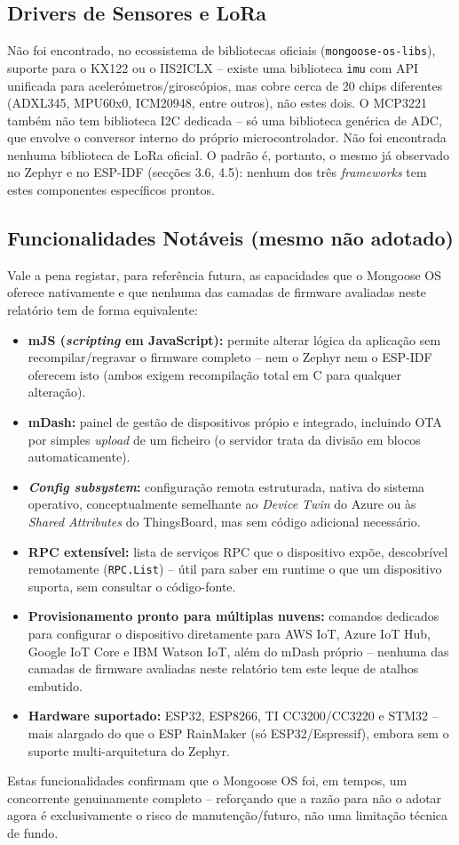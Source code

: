 \documentclass[a4paper,12pt]{article}
\begin{document}
\subsection{Drivers de Sensores e LoRa}
Não foi encontrado, no ecossistema de bibliotecas oficiais (\texttt{mongoose-os-libs}), suporte para o KX122 ou o IIS2ICLX -- existe uma biblioteca \texttt{imu} com API unificada para acelerómetros/giroscópios, mas cobre cerca de 20 chips diferentes (ADXL345, MPU60x0, ICM20948, entre outros), não estes dois. O MCP3221 também não tem biblioteca I2C dedicada -- só uma biblioteca genérica de ADC, que envolve o conversor interno do próprio microcontrolador. Não foi encontrada nenhuma biblioteca de LoRa oficial. O padrão é, portanto, o mesmo já observado no Zephyr e no ESP-IDF (secções 3.6, 4.5): nenhum dos três \textit{frameworks} tem estes componentes específicos prontos.

\subsection{Funcionalidades Notáveis (mesmo não adotado)}
Vale a pena registar, para referência futura, as capacidades que o Mongoose OS oferece nativamente e que nenhuma das camadas de firmware avaliadas neste relatório tem de forma equivalente:
\begin{itemize}
    \item \textbf{mJS (\textit{scripting} em JavaScript):} permite alterar lógica da aplicação sem recompilar/regravar o firmware completo -- nem o Zephyr nem o ESP-IDF oferecem isto (ambos exigem recompilação total em C para qualquer alteração).
    \item \textbf{mDash:} painel de gestão de dispositivos própio e integrado, incluindo OTA por simples \textit{upload} de um ficheiro (o servidor trata da divisão em blocos automaticamente).
    \item \textbf{\textit{Config subsystem}:} configuração remota estruturada, nativa do sistema operativo, conceptualmente semelhante ao \textit{Device Twin} do Azure ou às \textit{Shared Attributes} do ThingsBoard, mas sem código adicional necessário.
    \item \textbf{RPC extensível:} lista de serviços RPC que o dispositivo expõe, descobrível remotamente (\texttt{RPC.List}) -- útil para saber em runtime o que um dispositivo suporta, sem consultar o código-fonte.
    \item \textbf{Provisionamento pronto para múltiplas nuvens:} comandos dedicados para configurar o dispositivo diretamente para AWS IoT, Azure IoT Hub, Google IoT Core e IBM Watson IoT, além do mDash próprio -- nenhuma das camadas de firmware avaliadas neste relatório tem este leque de atalhos embutido.
    \item \textbf{Hardware suportado:} ESP32, ESP8266, TI CC3200/CC3220 e STM32 -- mais alargado do que o ESP RainMaker (só ESP32/Espressif), embora sem o suporte multi-arquitetura do Zephyr.
\end{itemize}
Estas funcionalidades confirmam que o Mongoose OS foi, em tempos, um concorrente genuinamente completo -- reforçando que a razão para não o adotar agora é exclusivamente o risco de manutenção/futuro, não uma limitação técnica de fundo.
\end{document}

